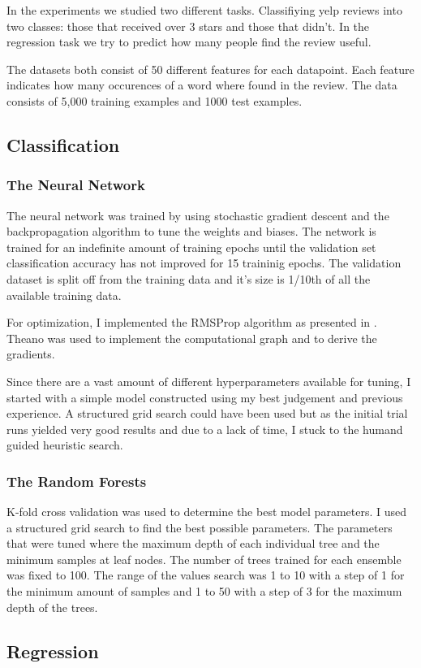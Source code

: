 
In the experiments we studied two different tasks. Classifiying yelp reviews into two classes: those that received over 3 stars and those that didn't. In the regression task we try to predict how many people find the review useful.

The datasets both consist of 50 different features for each datapoint. Each feature indicates how many occurences of a word where found in the review. The data consists of 5,000 training examples and 1000 test examples.

\subsection{Classification}

\subsubsection{The Neural Network}

The neural network was trained by using stochastic gradient descent and the backpropagation algorithm to tune the weights and biases. The network is trained for an indefinite amount of training epochs until the validation set classification accuracy has not improved for 15 traininig epochs. The validation dataset is split off from the training data and it's size is 1/10th of all the available training data.

For optimization, I implemented the RMSProp algorithm as presented in \cite{deep-learning-book}. Theano \cite{theano} was used to implement the computational graph and to derive the gradients.

Since there are a vast amount of different hyperparameters available for tuning, I started with a simple model constructed using my best judgement and previous experience. A structured grid search could have been used but as the initial trial runs yielded very good results and due to a lack of time, I stuck to the humand guided heuristic search.

\subsubsection{The Random Forests}

K-fold cross validation \cite{alpaydin} was used to determine the best model parameters. I used a structured grid search to find the best possible parameters. The parameters that were tuned where the maximum depth of each individual tree and the minimum samples at leaf nodes. The number of trees trained for each ensemble was fixed to 100. The range of the values search was 1 to 10 with a step of 1 for the minimum amount of samples and 1 to 50 with a step of 3 for the maximum depth of the trees.

\subsection{Regression}

